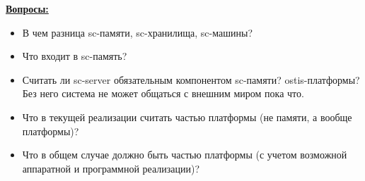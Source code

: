 \uline{\textbf{Вопросы:}}
\begin{itemize}
\item В чем разница sc-памяти, sc-хранилища, sc-машины?
\item Что входит в sc-память?
\item Считать ли sc-server обязательным компонентом sc-памяти? ostis-платформы? Без него система не может общаться с внешним миром пока что.
\item Что в текущей реализации считать частью платформы (не памяти, а вообще платформы)?
\item Что в общем случае должно быть частью платформы (с учетом возможной аппаратной и программной реализации)?
\end{itemize}

\newpage
